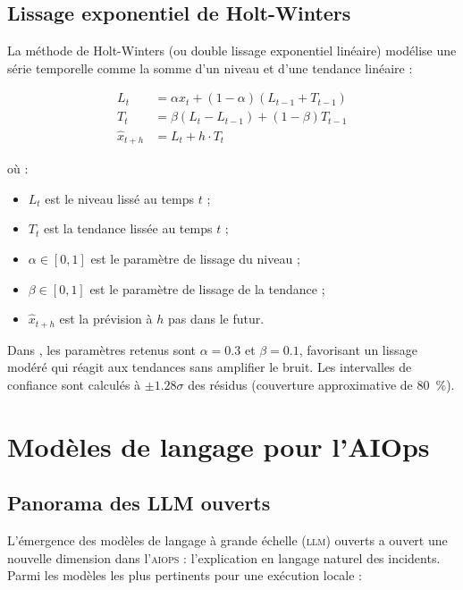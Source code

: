 \subsection{Lissage exponentiel de Holt-Winters}

La méthode de Holt-Winters \cite{holt1957forecasting, winters1960forecasting}
(ou double lissage exponentiel linéaire) modélise une série temporelle comme la
somme d'un niveau et d'une tendance linéaire :

\begin{align}
  L_t &= \alpha x_t + (1-\alpha)(L_{t-1} + T_{t-1}) \label{eq:hw_level} \\
  T_t &= \beta(L_t - L_{t-1}) + (1-\beta)T_{t-1}   \label{eq:hw_trend} \\
  \hat{x}_{t+h} &= L_t + h \cdot T_t               \label{eq:hw_forecast}
\end{align}

où :
\begin{itemize}
  \item $L_t$ est le niveau lissé au temps $t$ ;
  \item $T_t$ est la tendance lissée au temps $t$ ;
  \item $\alpha \in [0,1]$ est le paramètre de lissage du niveau ;
  \item $\beta \in [0,1]$ est le paramètre de lissage de la tendance ;
  \item $\hat{x}_{t+h}$ est la prévision à $h$ pas dans le futur.
\end{itemize}

Dans \caimp{}, les paramètres retenus sont $\alpha = 0.3$ et $\beta = 0.1$,
favorisant un lissage modéré qui réagit aux tendances sans amplifier le bruit.
Les intervalles de confiance sont calculés à $\pm 1.28 \sigma$ des résidus
(couverture approximative de 80~\%).

\section{Modèles de langage pour l'AIOps}

\subsection{Panorama des LLM ouverts}

L'émergence des modèles de langage à grande échelle (\textsc{llm}) ouverts a ouvert
une nouvelle dimension dans l'\textsc{aiops} : l'explication en langage naturel
des incidents. Parmi les modèles les plus pertinents pour une exécution locale :

